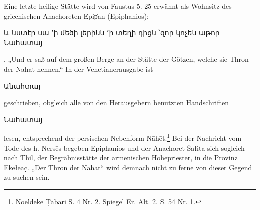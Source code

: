 \documentclass{article}
\begin{document}
Eine letzte heilige Stätte wird von Faustus 5. 25 erwähnt als Wohnsitz des griechischen Anachoreten Epip͑an (Epiphanios): \begin{armenian}և նստէր սա ՚ի մեծի լերինն ՚ի տեղի դիցն ՝զոր կոչեն աթոր Նահատայ\end{armenian}. „Und er saß auf dem großen Berge an der Stätte der Götzen, welche sie Thron der Nahat nennen.“ In der Venetianerausgabe ist \begin{armenian}Անահտայ\end{armenian} geschrieben, obgleich alle von den Herausgebern benutzten Handschriften \begin{armenian}Նահատայ\end{armenian} lesen, entsprechend der persischen Nebenform Nāhēt.\footnote{Noeldeke Ṭabari S. 4 Nr. 2. Spiegel Er. Alt. 2. S. 54 Nr. 1.} Bei der Nachricht vom Tode des h. Nersēs begeben Epiphanios und der Anachoret Šałita sich sogleich nach Thil, der Begräbnisstätte der armenischen Hohepriester, in die Provinz Ekełeac̣. „Der Thron der Nahat“ wird demnach nicht zu ferne von dieser Gegend zu suchen sein.
\end{document}
